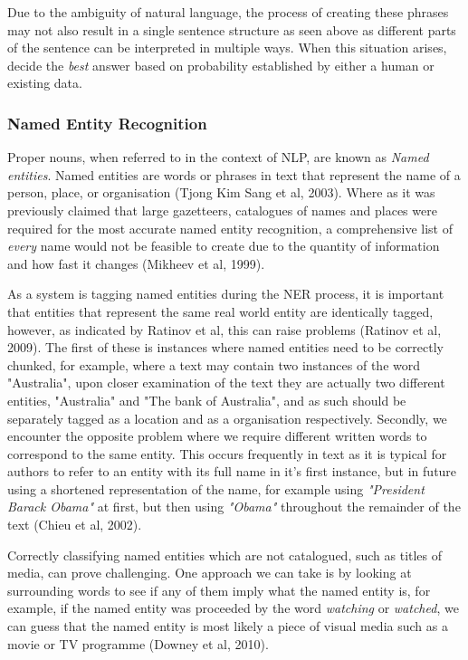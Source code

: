 \documentclass[12pt,a4paper]{article}
\begin{document}
Due to the ambiguity of natural language, the process of creating these phrases may not also result in a single sentence structure as seen above as different parts of the sentence can be interpreted in multiple ways. When this situation arises, decide the \emph{best} answer based on probability established by either a human or existing data. \newline

\subsubsection{Named Entity Recognition}
Proper nouns, when referred to in the context of NLP, are known as \emph{Named entities}. Named entities are words or phrases in text that represent the name of a person, place, or organisation (Tjong Kim Sang et al, 2003). Where as it was previously claimed that large gazetteers, catalogues of names and places were required for the most accurate named entity recognition, a comprehensive list of \emph{every} name would not be feasible to create due to the quantity of information and how fast it changes (Mikheev et al, 1999). \newline

As a system is tagging named entities during the NER process, it is important that entities that represent the same real world entity are identically tagged, however, as indicated by Ratinov et al, this can raise problems (Ratinov et al, 2009). The first of these is instances where named entities need to be correctly chunked, for example, where a text may contain two instances of the word "Australia", upon closer examination of the text they are actually two different entities, "Australia" and "The bank of Australia", and as such should be separately tagged as a location and as a organisation respectively. Secondly, we encounter the opposite problem where we require different written words to correspond to the same entity. This occurs frequently in text as it is typical for authors to refer to an entity with its full name in it's first instance, but in future using a shortened representation of the name, for example using \emph{"President Barack Obama"} at first, but then using \emph{"Obama"} throughout the remainder of the text (Chieu et al, 2002). \newline

Correctly classifying named entities which are not catalogued, such as titles of media, can prove challenging. One approach we can take is by looking at surrounding words to see if any of them imply what the named entity is, for example, if the named entity was proceeded by the word \emph{watching} or \emph{watched}, we can guess that the named entity is most likely a piece of visual media such as a movie or TV programme (Downey et al, 2010).
\end{document}
